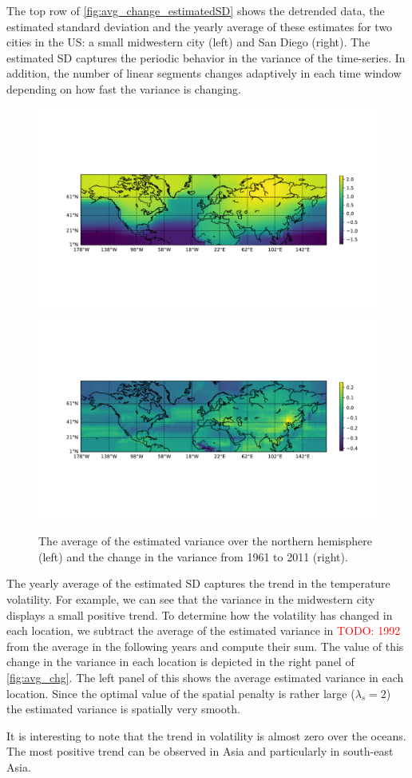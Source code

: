 \documentclass{article}
\newcommand{\attn}[1]{\textcolor{red}{TODO: #1}}
\begin{document}
The top row of \autoref{fig:avg_change_estimatedSD} shows the
detrended data, the estimated standard deviation and the yearly
average of these estimates for two cities in the US: a small
midwestern city (left) and San Diego (right). The estimated SD
captures the periodic behavior in the variance of the time-series. In
addition, the number of linear segments changes adaptively in each
time window depending on how fast the variance is changing.  
\begin{figure}[tb]
  \centering
  \includegraphics[width=.45\linewidth]{Figures/avg_logVar.pdf}
  \includegraphics[width=.45\linewidth]{Figures/avg_change_logVar.pdf}
  \caption{The
    average of the estimated variance over the northern hemisphere (left) and the
    change in the variance from 1961 to 2011 (right).}
\label{fig:avg_chg}
\end{figure}

The yearly average of the estimated SD captures the trend in the
temperature volatility. For example, we can see that the variance in
the midwestern city displays a small positive trend. To determine how the volatility has
changed in each location, we subtract the average of the estimated
variance in \attn{1992} from the average in the following years and compute
their sum. The value of this change in the variance in each location
is depicted in the right panel of
\autoref{fig:avg_chg}. The left panel of this
shows the average estimated variance in each location. Since the
optimal value of the spatial penalty is rather large ($\lambda_s=2$)
the estimated variance is spatially very smooth. 

It is interesting to note that the trend in volatility is almost zero
over the oceans. The most positive trend can be observed in Asia and
particularly in south-east Asia. 
\end{document}
